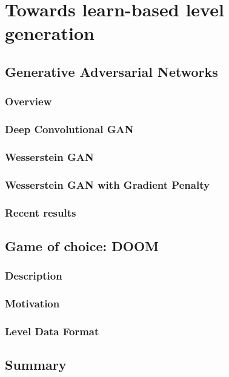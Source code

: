 \chapter{Towards learn-based level generation}
\section{Generative Adversarial Networks}
\subsection{Overview}
\subsection{Deep Convolutional GAN}
\subsection{Wesserstein GAN}
\subsection{Wesserstein GAN with Gradient Penalty}
\subsection{Recent results}

\section{Game of choice: DOOM}
\subsection{Description}
\subsection{Motivation}
\subsection{Level Data Format}

\section{Summary}
